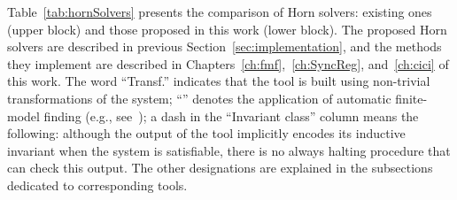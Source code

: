 Table~\cref{tab:hornSolvers} presents the comparison of Horn solvers: existing ones (upper block) and those proposed in this work (lower block). The proposed Horn solvers are described in previous Section~\ref{sec:implementation}, and the methods they implement are described in Chapters~\ref{ch:fmf},~\ref{ch:SyncReg}, and~\ref{ch:cici} of this work. The word ``Transf.'' indicates that the tool is built using non-trivial transformations of the system; ``\fmf{}'' denotes the application of automatic finite-model finding (e.\:g., see~\cite{10.1007/978-3-319-40970-2_20,reynolds2013finite}); a dash in the ``Invariant class'' column means the following: although the output of the tool implicitly encodes its inductive invariant when the system is satisfiable, there is no always halting procedure that can check this output. The other designations are explained in the subsections dedicated to corresponding tools.

